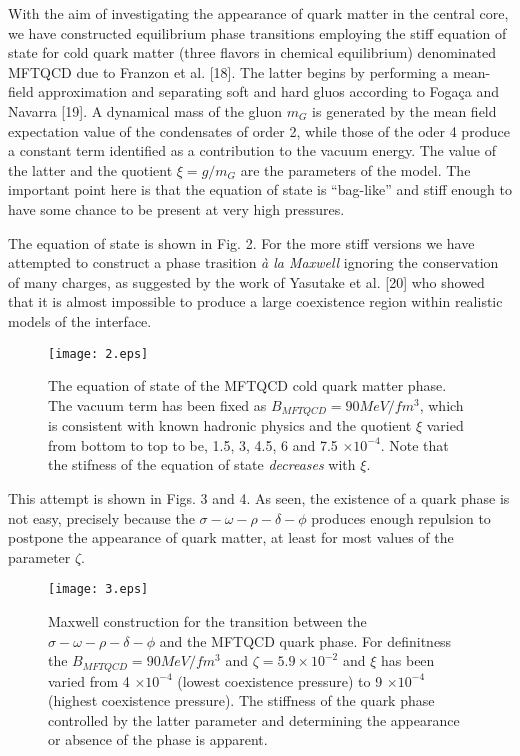 \documentclass[a4paper]{jpconf}
\begin{document}
With the aim of investigating the appearance of quark matter in the central core, we have constructed equilibrium phase transitions employing the stiff 
equation of state for cold quark matter (three flavors in chemical equilibrium) 
denominated MFTQCD due to Franzon et al. [18]. The latter begins by performing a mean-field approximation 
and separating soft and hard gluos according to Foga\c ca and Navarra [19]. A dynamical mass of the gluon $m_{G}$ is generated by the mean field 
expectation value of the condensates of order 2, while those of the oder 4 produce a constant term identified as a contribution to the vacuum energy.
The value of the latter and the quotient $\xi = g/m_{G}$ are the parameters of the model. 
The important point here is that the equation of state is ``bag-like'' and stiff enough to have some chance to be present at very high pressures.

The equation of state is shown in Fig. 2. For the more stiff versions we have attempted to construct a phase trasition {\it \`a la Maxwell} ignoring the 
conservation of many charges, as suggested by the work of Yasutake et al. [20]  who showed that it is almost impossible to produce 
a large coexistence region within realistic models of the interface.

\begin{figure}[h]
\texttt{[image: 2.eps]}\hspace{2pc}%
\begin{minipage}[b]{14pc}\caption{\label{label}The equation of state of the MFTQCD cold quark matter phase. The vacuum term has been fixed as $B_{MFTQCD}=90 MeV/fm^{3}$,  
which is consistent with known hadronic physics and the quotient $\xi$ varied from bottom to top to be, 1.5, 3, 4.5, 6 and 7.5 $\times 10^{-4}$. Note that the stifness of the equation 
of state {\it decreases} with $\xi$.}
\end{minipage}
\end{figure}

This attempt is shown in Figs. 3 and 4. As seen, the existence of a quark phase is not easy, precisely because the $\sigma - \omega - \rho - \delta - \phi$
produces enough repulsion to postpone the appearance of quark matter, at least for most values of the parameter $\zeta$. 


\begin{figure}[h]
\texttt{[image: 3.eps]}\hspace{2pc}%
\begin{minipage}[b]{14pc}\caption{\label{label}Maxwell construction for the transition between the $\sigma - \omega - \rho - \delta - \phi$ and the MFTQCD quark phase. 
For definitness the $B_{MFTQCD}=90 MeV/fm^{3}$ and $\zeta = 5.9 \times 10^{-2}$ and $\xi$ has been varied from 4 $\times 10^{-4}$ (lowest coexistence pressure) to 
9 $\times 10^{-4}$ (highest coexistence pressure). The stiffness of the quark phase controlled by the latter parameter and determining the appearance or absence of 
the phase is apparent. }
\end{minipage}
\end{figure}
\end{document}
